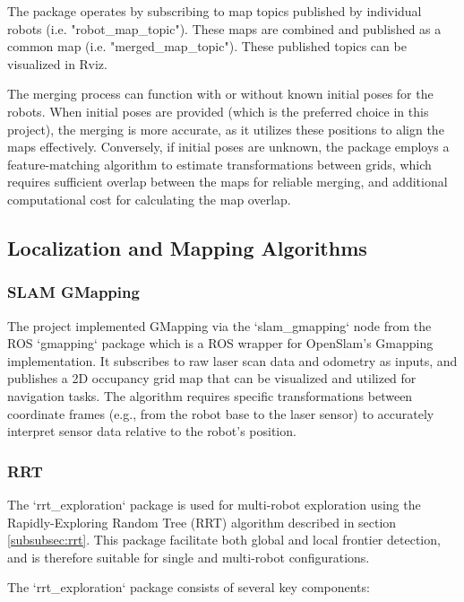 \documentclass[a4paper,twocolumn]{article}
\begin{document}
The package operates by subscribing to map topics published by individual robots (i.e. "robot\_map\_topic"). These maps are combined and published as a common map (i.e. "merged\_map\_topic"). These published topics can be visualized in Rviz. 

The merging process can function with or without known initial poses for the robots. When initial poses are provided (which is the preferred choice in this project), the merging is more accurate, as it utilizes these positions to align the maps effectively. Conversely, if initial poses are unknown, the package employs a feature-matching algorithm to estimate transformations between grids, which requires sufficient overlap between the maps for reliable merging, and additional computational cost for calculating the map overlap.

\subsection{Localization and Mapping Algorithms}
\subsubsection{SLAM GMapping}
The project implemented GMapping via the `slam\_gmapping` node from the ROS `gmapping` package which is a ROS wrapper for OpenSlam's Gmapping implementation\cite{rabaud_gmapping}. It subscribes to raw laser scan data and odometry as inputs, and publishes a 2D occupancy grid map that can be visualized and utilized for navigation tasks. The algorithm requires specific transformations between coordinate frames (e.g., from the robot base to the laser sensor) to accurately interpret sensor data relative to the robot's position.

\subsubsection{RRT}
The `rrt\_exploration` package is used for multi-robot exploration using the Rapidly-Exploring Random Tree (RRT) algorithm described in section \ref{subsubsec:rrt}. This package facilitate both global and local frontier detection, and is therefore suitable for single and multi-robot configurations. 

The `rrt\_exploration` package consists of several key components:
\end{document}
